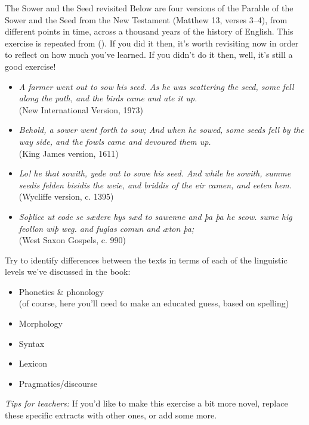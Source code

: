 \begin{exercises}{The Sower and the Seed revisited}\label{sower-and-seed-2}
Below are four versions of the Parable of the Sower and the Seed from the New Testament (Matthew 13, verses 3--4), from different points in time, across a thousand years of the history of English. This exercise is repeated from  (). If you did it then, it's worth revisiting now in order to reflect on how much you've learned. If you didn't do it then, well, it's still a good exercise!

\begin{itemize}
    \item \textit{A farmer went out to sow his seed. As he was scattering the seed, some fell along the path, and the birds came and ate it up.}\\ 
	(New International Version, 1973)
    \item \textit{Behold, a sower went forth to sow; And when he sowed, some seeds fell by the way side, and the fowls came and devoured them up.}\\ 
	(King James version, 1611)
    \item \textit{Lo! he that sowith, yede out to sowe his seed. And while he sowith, summe seedis felden bisidis the weie, and briddis of the eir camen, and eeten hem.}\\
	(Wycliffe version, c. 1395)
    \item \textit{Soþlice ut eode se sædere hys sæd to sawenne and þa þa he seow. sume hig feollon wiþ weg. and fuglas comun and æton þa;}\\
    (West Saxon Gospels, c. 990)
\end{itemize}

\noindent Try to identify differences between the texts in terms of each of the linguistic levels we've discussed in the book:
\begin{itemize}
    \item Phonetics \& phonology\\ 
    (of course, here you'll need to make an educated guess, based on spelling)
    \item Morphology
    \item Syntax
    \item Lexicon
    \item Pragmatics/discourse
\end{itemize}

\noindent \emph{Tips for teachers:} If you'd like to make this exercise a bit more novel, replace these specific extracts with other ones, or add some more.

\end{exercises}

